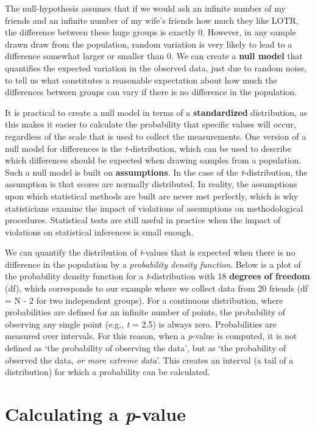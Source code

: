 \documentclass[
]{krantz}
\begin{document}
The null-hypothesis assumes that if we would ask an infinite number of my friends and an infinite number of my wife's friends how much they like LOTR, the difference between these huge groups is exactly 0. However, in any sample drawn draw from the population, random variation is very likely to lead to a difference somewhat larger or smaller than 0. We can create a \textbf{null model} that quantifies the expected variation in the observed data, just due to random noise, to tell us what constitutes a reasonable expectation about how much the differences between groups can vary if there is no difference in the population.

It is practical to create a null model in terms of a \textbf{standardized} distribution, as this makes it easier to calculate the probability that specific values will occur, regardless of the scale that is used to collect the measurements. One version of a null model for differences is the \emph{t}-distribution, which can be used to describe which differences should be expected when drawing samples from a population. Such a null model is built on \textbf{assumptions}. In the case of the \emph{t}-distribution, the assumption is that scores are normally distributed. In reality, the assumptions upon which statistical methods are built are never met perfectly, which is why statisticians examine the impact of violations of assumptions on methodological procedures. Statistical tests are still useful in practice when the impact of violations on statistical inferences is small enough.

We can quantify the distribution of \emph{t}-values that is expected when there is no difference in the population by a \emph{probability density function}. Below is a plot of the probability density function for a \emph{t}-distribution with 18 \textbf{degrees of freedom} (df), which corresponds to our example where we collect data from 20 friends (df = N - 2 for two independent groups). For a continuous distribution, where probabilities are defined for an infinite number of points, the probability of observing any single point (e.g., \emph{t} = 2.5) is always zero. Probabilities are measured over intervals. For this reason, when a \emph{p}-value is computed, it is not defined as `the probability of observing the data', but as `the probability of observed the data, \emph{or more extreme data}'. This creates an interval (a tail of a distribution) for which a probability can be calculated.

\hypertarget{calculating-a-p-value}{%
\section{\texorpdfstring{Calculating a \emph{p}-value}{Calculating a p-value}}\label{calculating-a-p-value}}
\end{document}
